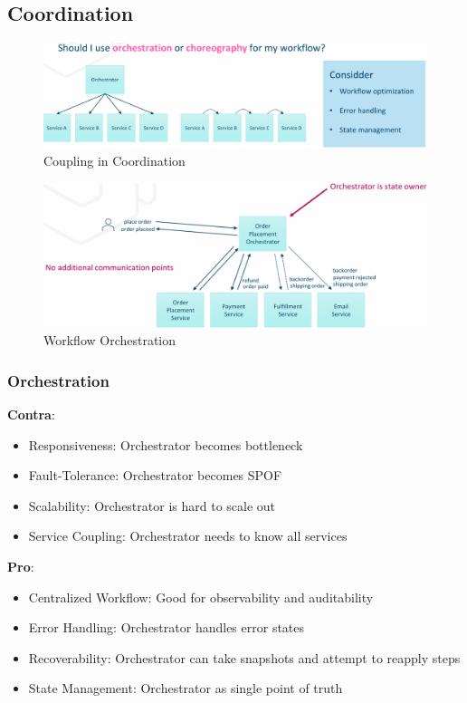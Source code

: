 \documentclass[../Main.tex]{subfiles}
\begin{document}
\subsection{Coordination}
\begin{figure}[H]
    \centering
    \includegraphics[width=1\linewidth]{Images/coupling-coord.png}
    \caption{Coupling in Coordination}
\end{figure}

\begin{figure}[H]
    \centering
    \includegraphics[width=1\linewidth]{Images/workflow-orchestration.png}
    \caption{Workflow Orchestration}
\end{figure}

\newpage
\subsubsection{Orchestration}
\begin{multicols}{2}
    \textbf{Contra}:
    \begin{itemize}
        \item Responsiveness: Orchestrator becomes bottleneck
        \item Fault-Tolerance: Orchestrator becomes SPOF
        \item Scalability: Orchestrator is hard to scale out
        \item Service Coupling: Orchestrator needs to know all services
    \end{itemize}
    \columnbreak
    \textbf{Pro}:
    \begin{itemize}
        \item Centralized Workflow: Good for observability and auditability
        \item Error Handling: Orchestrator handles error states
        \item Recoverability: Orchestrator can take snapshots and attempt to reapply steps
        \item State Management: Orchestrator as single point of truth
    \end{itemize}
\end{multicols}
\end{document}
